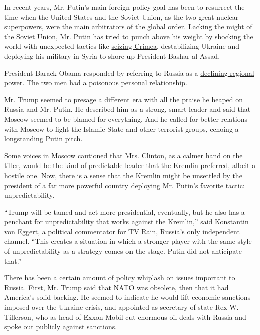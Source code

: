 In recent years, Mr. Putin's main foreign policy goal has been to
resurrect the time when the United States and the Soviet Union, as the
two great nuclear superpowers, were the main arbitrators of the global
order. Lacking the might of the Soviet Union, Mr. Putin has tried to
punch above his weight by shocking the world with unexpected tactics
like
\href{https://www.nytimes.com/2014/03/19/world/europe/ukraine.html}{seizing
Crimea}, destabilizing Ukraine and deploying his military in Syria to
shore up President Bashar al-Assad.

President Barack Obama responded by referring to Russia as a
\href{https://www.nytimes.com/2014/03/26/world/europe/hague-summit-focuses-on-preventing-trafficking-of-nuclear-materials.html}{declining
regional power}. The two men had a poisonous personal relationship.

Mr. Trump seemed to presage a different era with all the praise he
heaped on Russia and Mr. Putin. He described him as a strong, smart
leader and said that Moscow seemed to be blamed for everything. And he
called for better relations with Moscow to fight the Islamic State and
other terrorist groups, echoing a longstanding Putin pitch.

Some voices in Moscow cautioned that Mrs. Clinton, as a calmer hand on
the tiller, would be the kind of predictable leader that the Kremlin
preferred, albeit a hostile one. Now, there is a sense that the Kremlin
might be unsettled by the president of a far more powerful country
deploying Mr. Putin's favorite tactic: unpredictability.

``Trump will be tamed and act more presidential, eventually, but he also
has a penchant for unpredictability that works against the Kremlin,''
said Konstantin von Eggert, a political commentator for
\href{https://www.theguardian.com/cities/2015/jun/09/tv-rain-russia-only-independent-television-channel}{TV
Rain}, Russia's only independent channel. ``This creates a situation in
which a stronger player with the same style of unpredictability as a
strategy comes on the stage. Putin did not anticipate that.''

There has been a certain amount of policy whiplash on issues important
to Russia. First, Mr. Trump said that NATO was obsolete, then that it
had America's solid backing. He seemed to indicate he would lift
economic sanctions imposed over the Ukraine crisis, and appointed as
secretary of state Rex W. Tillerson, who as head of Exxon Mobil cut
enormous oil deals with Russia and spoke out publicly against sanctions.

